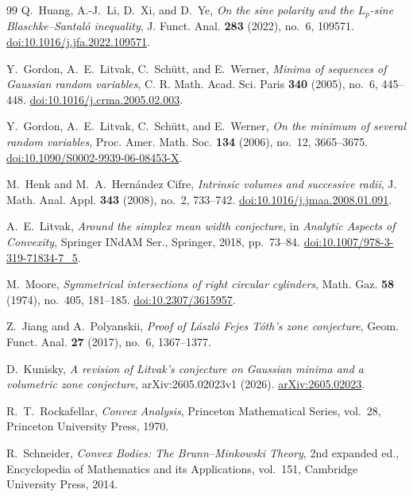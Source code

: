 \documentclass[10pt,reqno]{amsart}
\theoremstyle{definition}
\theoremstyle{remark}
\begin{document}
\begin{thebibliography}{99}
Q.~Huang, A.-J.~Li, D.~Xi, and D.~Ye,
\emph{On the sine polarity and the $L_p$-sine Blaschke--Santal\'o inequality},
J. Funct. Anal. \textbf{283} (2022), no.~6, 109571.
\href{https://doi.org/10.1016/j.jfa.2022.109571}{doi:10.1016/j.jfa.2022.109571}.

Y.~Gordon, A.~E.~Litvak, C.~Sch\"utt, and E.~Werner,
\emph{Minima of sequences of Gaussian random variables},
C. R. Math. Acad. Sci. Paris \textbf{340} (2005), no.~6, 445--448.
\href{https://doi.org/10.1016/j.crma.2005.02.003}{doi:10.1016/j.crma.2005.02.003}.

Y.~Gordon, A.~E.~Litvak, C.~Sch\"utt, and E.~Werner,
\emph{On the minimum of several random variables},
Proc. Amer. Math. Soc. \textbf{134} (2006), no.~12, 3665--3675.
\href{https://doi.org/10.1090/S0002-9939-06-08453-X}{doi:10.1090/S0002-9939-06-08453-X}.

M.~Henk and M.~A.~Hern\'andez Cifre,
\emph{Intrinsic volumes and successive radii},
J. Math. Anal. Appl. \textbf{343} (2008), no.~2, 733--742.
\href{https://doi.org/10.1016/j.jmaa.2008.01.091}{doi:10.1016/j.jmaa.2008.01.091}.

A.~E.~Litvak,
\emph{Around the simplex mean width conjecture},
in \emph{Analytic Aspects of Convexity}, Springer INdAM Ser., Springer, 2018, pp.~73--84.
\href{https://doi.org/10.1007/978-3-319-71834-7_5}{doi:10.1007/978-3-319-71834-7\_5}.

M.~Moore,
\emph{Symmetrical intersections of right circular cylinders},
Math. Gaz. \textbf{58} (1974), no.~405, 181--185.
\href{https://doi.org/10.2307/3615957}{doi:10.2307/3615957}.

Z.~Jiang and A.~Polyanskii,
\emph{Proof of L\'aszl\'o Fejes T\'oth's zone conjecture},
Geom. Funct. Anal. \textbf{27} (2017), no.~6, 1367--1377.

D.~Kunisky,
\emph{A revision of Litvak's conjecture on Gaussian minima and a volumetric zone conjecture}, arXiv:2605.02023v1 (2026).
\href{https://arxiv.org/abs/2605.02023}{arXiv:2605.02023}.

R.~T.~Rockafellar,
\emph{Convex Analysis}, Princeton Mathematical Series, vol.~28, Princeton University Press, 1970.

R.~Schneider,
\emph{Convex Bodies: The Brunn--Minkowski Theory}, 2nd expanded ed., Encyclopedia of Mathematics and its Applications, vol.~151, Cambridge University Press, 2014.
\end{thebibliography}
\end{document}
